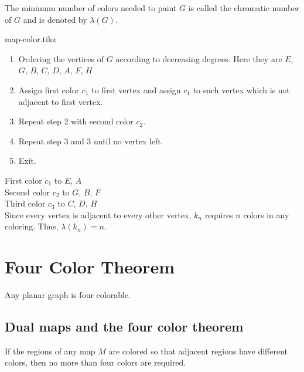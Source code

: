 \documentclass[../main-sheet.tex]{subfiles}
\begin{document}
\begin{itemize}
    The minimum number of colors needed to paint $ G $ is called the chromatic number of $ G $ and is denoted by $ \lambda(G) $.\\
    \begin{center}
        {map-color.tikz}
    \end{center}
    \begin{enumerate}
        \item Ordering the vertices of $ G $ according to decreasing degrees. Here they are $ E$, $G$, $B$, $C$, $D$, $A$, $F$, $H $
        \item Assign first color $ c_1 $ to first vertex and assign $ c_1 $ to each vertex which is not adjacent to first vertex.
        \item Repeat step 2 with second color $ c_2 $.
        \item Repeat step 3 and 3 until no vertex left.
        \item Exit.
    \end{enumerate}
    First color $ c_1 $ to $ E,\,A $\\
    Second color $ c_2 $ to $ G, \,B,\,F $\\
    Third color $ c_3 $ to $ C,\,D,\,H $\\
    Since every vertex is adjacent to every other vertex, $ k_n $ requires $ n $ colors in any coloring. Thus, $ \lambda(k_n)=n $.
\end{itemize}
\section{Four Color Theorem}
Any planar graph is four colorable.
\subsection{Dual maps and the four color theorem}
If the regions of any map $ M $ are colored so that adjacent regions have different colors, then no more than four colors are required.
\end{document}
